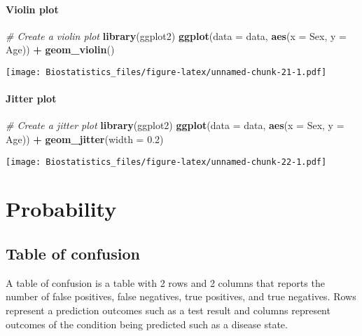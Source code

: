 \documentclass[]{book}
\newenvironment{Shaded}{\begin{snugshade}}{\end{snugshade}}
\newcommand{\KeywordTok}[1]{\textcolor[rgb]{0.13,0.29,0.53}{\textbf{#1}}}
\newcommand{\DataTypeTok}[1]{\textcolor[rgb]{0.13,0.29,0.53}{#1}}
\newcommand{\FloatTok}[1]{\textcolor[rgb]{0.00,0.00,0.81}{#1}}
\newcommand{\StringTok}[1]{\textcolor[rgb]{0.31,0.60,0.02}{#1}}
\newcommand{\CommentTok}[1]{\textcolor[rgb]{0.56,0.35,0.01}{\textit{#1}}}
\newcommand{\OperatorTok}[1]{\textcolor[rgb]{0.81,0.36,0.00}{\textbf{#1}}}
\newcommand{\NormalTok}[1]{#1}
\theoremstyle{definition}
\theoremstyle{definition}
\theoremstyle{definition}
\theoremstyle{remark}
\begin{document}
\subsubsection{Violin plot}\label{violin-plot}

\begin{Shaded}
\begin{Highlighting}[]
\CommentTok{# Create a violin plot}
\KeywordTok{library}\NormalTok{(ggplot2)}
\KeywordTok{ggplot}\NormalTok{(}\DataTypeTok{data =}\NormalTok{ data, }\KeywordTok{aes}\NormalTok{(}\DataTypeTok{x =}\NormalTok{ Sex, }\DataTypeTok{y =}\NormalTok{ Age)) }\OperatorTok{+}
\StringTok{  }\KeywordTok{geom_violin}\NormalTok{()}
\end{Highlighting}
\end{Shaded}

\texttt{[image: Biostatistics\_files/figure-latex/unnamed-chunk-21-1.pdf]}

\subsubsection{Jitter plot}\label{jitter-plot}

\begin{Shaded}
\begin{Highlighting}[]
\CommentTok{# Create a jitter plot}
\KeywordTok{library}\NormalTok{(ggplot2)}
\KeywordTok{ggplot}\NormalTok{(}\DataTypeTok{data =}\NormalTok{ data, }\KeywordTok{aes}\NormalTok{(}\DataTypeTok{x =}\NormalTok{ Sex, }\DataTypeTok{y =}\NormalTok{ Age)) }\OperatorTok{+}
\StringTok{  }\KeywordTok{geom_jitter}\NormalTok{(}\DataTypeTok{width =} \FloatTok{0.2}\NormalTok{)}
\end{Highlighting}
\end{Shaded}

\texttt{[image: Biostatistics\_files/figure-latex/unnamed-chunk-22-1.pdf]}

\chapter{Probability}\label{probability}

\section{Table of confusion}\label{table-of-confusion}

A table of confusion is a table with 2 rows and 2 columns that reports
the number of false positives, false negatives, true positives, and true
negatives. Rows represent a prediction outcomes such as a test result
and columns represent outcomes of the condition being predicted such as
a disease state.
\end{document}
